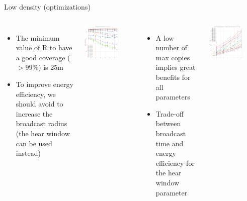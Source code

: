 \documentclass[aspectratio=169]{beamer}
\begin{document}
\begin{frame}{Low density (optimizations)}
	\footnotesize
	\begin{columns}
	        \begin{itemize}
	        \item The minimum value of R to have a good coverage (\(> 99\%\)) is 25m
	        \item To improve energy efficiency, we should avoid to increase
			the broadcast radius (the hear window can be used
			instead)
	        \end{itemize}
	        \begin{center}
	            \includegraphics[width=0.7\textwidth]{img/ld/messages-R-ffplot.png}
	        \end{center}
	        \begin{itemize}
	        \item A low number of max copies implies great benefits for all parameters
	        \item Trade-off between broadcast time and energy efficiency for the hear window parameter
	        \end{itemize}
	        \begin{center}
	            \includegraphics[width=0.7\textwidth]{img/ld/broadcasttime-T-ffplot.png}
	        \end{center}
	\end{columns}
\end{frame}
\end{document}
